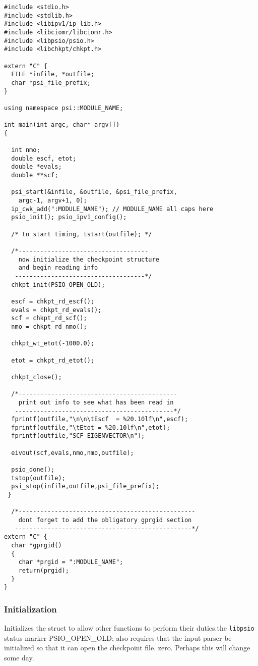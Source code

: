 \begin{verbatim}
#include <stdio.h>
#include <stdlib.h>
#include <libipv1/ip_lib.h>
#include <libciomr/libciomr.h>
#include <libpsio/psio.h>
#include <libchkpt/chkpt.h>

extern "C" {
  FILE *infile, *outfile;
  char *psi_file_prefix;
}

using namespace psi::MODULE_NAME; 

int main(int argc, char* argv[])
{
 
  int nmo;
  double escf, etot;
  double *evals;
  double **scf;

  psi_start(&infile, &outfile, &psi_file_prefix,
    argc-1, argv+1, 0);
  ip_cwk_add(":MODULE_NAME"); // MODULE_NAME all caps here
  psio_init(); psio_ipv1_config();

  /* to start timing, tstart(outfile); */

  /*------------------------------------
    now initialize the checkpoint structure
    and begin reading info
   ------------------------------------*/
  chkpt_init(PSIO_OPEN_OLD);

  escf = chkpt_rd_escf();
  evals = chkpt_rd_evals();
  scf = chkpt_rd_scf();
  nmo = chkpt_rd_nmo();
 
  chkpt_wt_etot(-1000.0);
  
  etot = chkpt_rd_etot();

  chkpt_close();

  /*--------------------------------------------
    print out info to see what has been read in
   --------------------------------------------*/
  fprintf(outfile,"\n\n\tEscf  = %20.10lf\n",escf);
  fprintf(outfile,"\tEtot = %20.10lf\n",etot);
  fprintf(outfile,"SCF EIGENVECTOR\n");

  eivout(scf,evals,nmo,nmo,outfile); 
  
  psio_done();
  tstop(outfile);
  psi_stop(infile,outfile,psi_file_prefix);
 }

  /*-------------------------------------------------
    dont forget to add the obligatory gprgid section 
   -------------------------------------------------*/
extern "C" {
  char *gprgid()
  {
    char *prgid = ":MODULE_NAME";
    return(prgid);
  }
}
\end{verbatim}

\subsubsection{Initialization}
{Initializes the  struct to allow other 
functions to perform their duties.}{the {\tt libpsio} status marker PSIO\_OPEN\_OLD; also requires that
the input parser be initialized so that it can open the checkpoint file.}
{zero.  Perhaps this will change some day.} \\

